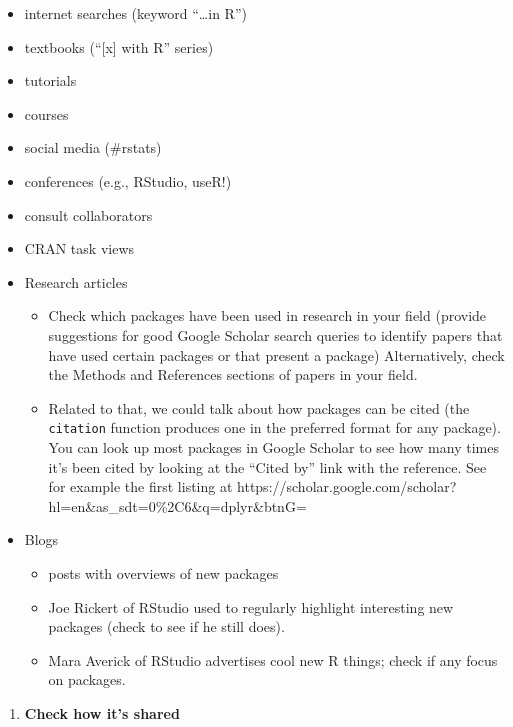 \documentclass[10pt,letterpaper]{article}
\providecommand{\tightlist}{%
  \setlength{\itemsep}{0pt}\setlength{\parskip}{0pt}}
\begin{document}
\begin{itemize}
\tightlist
\item
  internet searches (keyword ``\ldots in R'')
\item
  textbooks (``{[}x{]} with R'' series)
\item
  tutorials
\item
  courses
\item
  social media (\#rstats)
\item
  conferences (e.g., RStudio, useR!)
\item
  consult collaborators
\item
  CRAN task views
\item
  Research articles

  \begin{itemize}
  \tightlist
  \item
    Check which packages have been used in research in your field
    (provide suggestions for good Google Scholar search queries to
    identify papers that have used certain packages or that present a
    package) Alternatively, check the Methods and References sections of
    papers in your field.
  \item
    Related to that, we could talk about how packages can be cited (the
    \texttt{citation} function produces one in the preferred format for
    any package). You can look up most packages in Google Scholar to see
    how many times it's been cited by looking at the ``Cited by'' link
    with the reference. See for example the first listing at
    https://scholar.google.com/scholar?hl=en\&as\_sdt=0\%2C6\&q=dplyr\&btnG=
  \end{itemize}
\item
  Blogs

  \begin{itemize}
  \tightlist
  \item
    posts with overviews of new packages
  \item
    Joe Rickert of RStudio used to regularly highlight interesting new
    packages (check to see if he still does).
  \item
    Mara Averick of RStudio advertises cool new R things; check if any
    focus on packages.
  \end{itemize}
\end{itemize}

\begin{enumerate}
\def\labelenumi{\arabic{enumi}.}
\setcounter{enumi}{2}
\tightlist
\item
  \textbf{Check how it's shared}
\end{enumerate}
\end{document}
